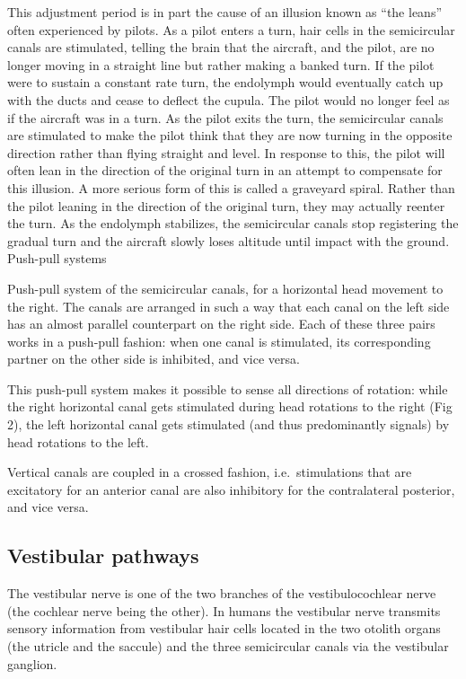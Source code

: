 This adjustment period is in part the cause of an illusion known as ``the leans'' often experienced by pilots. As a pilot enters a turn, hair cells in the semicircular canals are stimulated, telling the brain that the aircraft, and the pilot, are no longer moving in a straight line but rather making a banked turn. If the pilot were to sustain a constant rate turn, the endolymph would eventually catch up with the ducts and cease to deflect the cupula. The pilot would no longer feel as if the aircraft was in a turn. As the pilot exits the turn, the semicircular canals are stimulated to make the pilot think that they are now turning in the opposite direction rather than flying straight and level. In response to this, the pilot will often lean in the direction of the original turn in an attempt to compensate for this illusion. A more serious form of this is called a graveyard spiral. Rather than the pilot leaning in the direction of the original turn, they may actually reenter the turn. As the endolymph stabilizes, the semicircular canals stop registering the gradual turn and the aircraft slowly loses altitude until impact with the ground.
Push-pull systems

Push-pull system of the semicircular canals, for a horizontal head movement to the right.
The canals are arranged in such a way that each canal on the left side has an almost parallel counterpart on the right side. Each of these three pairs works in a push-pull fashion: when one canal is stimulated, its corresponding partner on the other side is inhibited, and vice versa.

This push-pull system makes it possible to sense all directions of rotation: while the right horizontal canal gets stimulated during head rotations to the right (Fig 2), the left horizontal canal gets stimulated (and thus predominantly signals) by head rotations to the left.

Vertical canals are coupled in a crossed fashion, i.e.~stimulations that are excitatory for an anterior canal are also inhibitory for the contralateral posterior, and vice versa.

\hypertarget{vestibular-pathways}{%
\subsection{Vestibular pathways}\label{vestibular-pathways}}

The vestibular nerve is one of the two branches of the vestibulocochlear nerve (the cochlear nerve being the other). In humans the vestibular nerve transmits sensory information from vestibular hair cells located in the two otolith organs (the utricle and the saccule) and the three semicircular canals via the vestibular ganglion.

